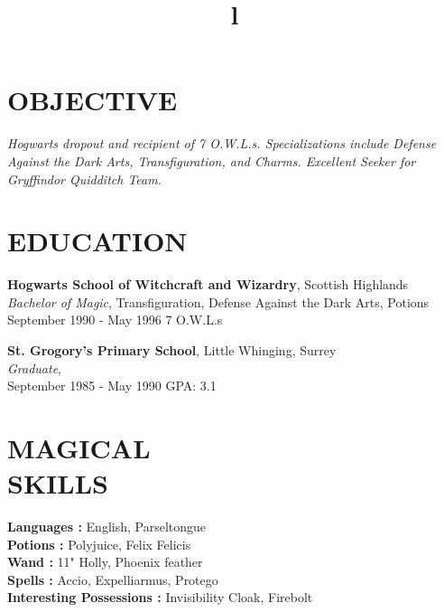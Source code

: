 \documentclass[margin]{res}
\begin{document}

\address{harryjpotter@ministryofmagic.co.uk \\(+44) 7481324987\\}

\begin{resume}

\section{OBJECTIVE}
{\sl Hogwarts dropout and recipient of 7 O.W.L.s. Specializations include Defense Against the Dark Arts, Transfiguration, and Charms. Excellent Seeker for Gryffindor Quidditch Team. }

\section{EDUCATION}
\textbf{Hogwarts School of Witchcraft and Wizardry}, Scottish Highlands\\
{\sl Bachelor of Magic}, Transfiguration, Defense Against the Dark Arts, Potions\\
September 1990 - May 1996
\hfill 7 O.W.L.s

\textbf{St. Grogory's Primary School}, Little Whinging, Surrey \\
{\sl Graduate}, \\
September 1985 - May 1990
\hfill GPA: 3.1

\section{MAGICAL\\SKILLS}

\textbf{Languages : } English, Parseltongue
\\
\textbf{Potions :} Polyjuice, Felix Felicis
\\
\textbf{Wand : } 11" Holly, Phoenix feather
\\
\textbf{Spells : } Accio, Expelliarmus, Protego
\\
\textbf{Interesting Possessions : } Invisibility Cloak, Firebolt

\begin{format}
\title{l}\\
\\
\body\\
\end{format}


\end{resume}
\end{document}
